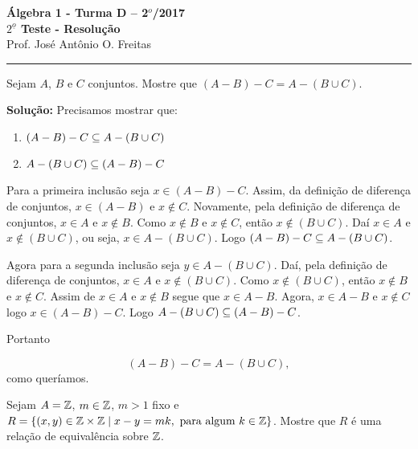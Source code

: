 \documentclass[12pt]{article}
\begin{document}


\begin{center}
{\Large\bf {\'A}lgebra 1 - Turma D -- 2$^{o}$/2017} \\ \vspace{9pt} {\large\bf
  $2^{\underline{o}}$ Teste - Resolu\c{c}\~ao}\\
\vspace{9pt} Prof. Jos{\'e} Ant{\^o}nio O. Freitas
\end{center}
\hrule

\vspace{.6cm}


\vspace{.6cm}

\questao Sejam $A$, $B$ e $C$ conjuntos. Mostre que $(A - B) - C = A - (B \cup C)$.

\noindent\textbf{Solu\c{c}\~ao:} Precisamos mostrar que:
\begin{enumerate}
	\item $(A - B) - C \subseteq A - (B \cup C)$
	\item $A - (B \cup C) \subseteq (A - B) - C$
\end{enumerate}

Para a primeira inclusão seja $x \in (A - B) - C$. Assim, da definição de diferença de conjuntos, $x \in (A - B)$ e $x \notin C$. Novamente, pela definição de diferença de conjuntos, $x \in A$ e $x \notin B$. Como $x \notin B$ e $x \notin C$, então $x \notin (B \cup C)$. Daí $x \in A$ e $x \notin (B \cup C)$, ou seja, $x \in A - (B \cup C)$. Logo $(A - B) - C \subseteq A - (B \cup C)$.

Agora para a segunda inclusão seja $y \in A - (B \cup C)$. Daí, pela definição de diferença de conjuntos, $x \in A$ e $x \notin (B \cup C)$. Como $x \notin (B \cup C)$, então $x \notin B$ e $x \notin C$. Assim de $x \in A$ e $x \notin B$ segue que $x \in A - B$. Agora, $x \in A - B$ e $x \notin C$ logo $x \in (A - B) - C$. Logo $A - (B \cup C) \subseteq (A - B) - C$.

Portanto

\[
	(A - B) - C = A - (B \cup C),
\]
como queríamos.

\vspace{.5cm}

\questao Sejam $A = \mathbb{Z}$, $m \in \mathbb{Z}$, $m > 1$ fixo e $R = \{(x,y)\in \mathbb{Z} \times \mathbb{Z} \mid x - y = mk, \mbox{ para algum } k \in \mathbb{Z}\}$. Mostre que $R$
é uma rela{\c c}{\~a}o de equival{\^e}ncia sobre $\mathbb{Z}$.
\end{document}
